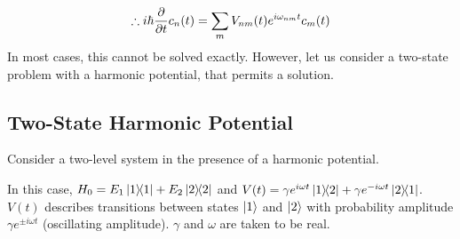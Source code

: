 \documentclass[12pt,a4paper,titlepage]{article}
\begin{document}
\begin{equation}
\therefore i\hbar\pdv{t}c_{n}(t)=\sum_{m}V_{nm}(t)e^{i\omega_{nm}t}c_{m}(t)
\end{equation}
In most cases, this cannot be solved exactly. However, let us consider a two-state problem with a harmonic potential, that permits a solution.

\subsection{Two-State Harmonic Potential}
Consider a two-level system in the presence of a harmonic potential.
\begin{center}
\end{center}
In this case, $H_{0}=E_{1}\op{1}+E_{2}\op{2}$ and $V(t)=\gamma e^{i\omega t}\op{1}{2}+\gamma e^{-i\omega t}\op{2}{1}$. $V(t)$ describes transitions between states $\ket{1}$ and $\ket{2}$ with probability amplitude $\gamma e^{\pm i\omega t}$ (oscillating amplitude). $\gamma$ and $\omega$ are taken to be real.\\
\end{document}
